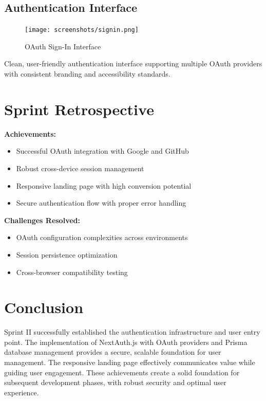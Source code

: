 \subsection{Authentication Interface}
\begin{figure}[H]
    \centering
    \texttt{[image: screenshots/signin.png]}
    \caption{OAuth Sign-In Interface}
    \label{fig:signin_page}
\end{figure}

Clean, user-friendly authentication interface supporting multiple OAuth providers with consistent branding and accessibility standards.

\section{Sprint Retrospective}

\textbf{Achievements:}
\begin{itemize}
    \item Successful OAuth integration with Google and GitHub
    \item Robust cross-device session management
    \item Responsive landing page with high conversion potential
    \item Secure authentication flow with proper error handling
\end{itemize}

\textbf{Challenges Resolved:}
\begin{itemize}
    \item OAuth configuration complexities across environments
    \item Session persistence optimization
    \item Cross-browser compatibility testing
\end{itemize}

\section{Conclusion}

Sprint II successfully established the authentication infrastructure and user entry point. The implementation of NextAuth.js with OAuth providers and Prisma database management provides a secure, scalable foundation for user management. The responsive landing page effectively communicates value while guiding user engagement. These achievements create a solid foundation for subsequent development phases, with robust security and optimal user experience.